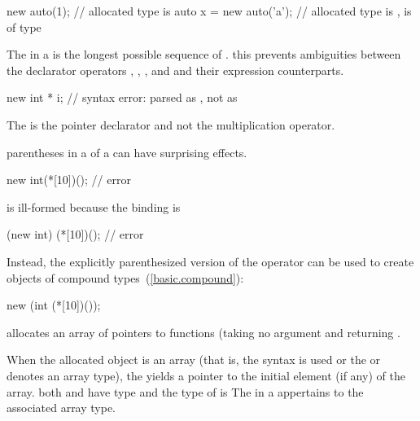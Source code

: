 \enterexample
\begin{codeblock}
new auto(1);                    // allocated type is 
auto x = new auto('a');         // allocated type is ,  is of type 
\end{codeblock}
\exitexample

\pnum
The  in a  is the longest
possible sequence of .
\enternote 
this prevents ambiguities between the declarator operators \tcode{\&}, \tcode{\&\&},
\tcode{*}, and \tcode{[]} and their expression counterparts.
\exitnote 
\enterexample 

\begin{codeblock}
new int * i;                    // syntax error: parsed as , not as 
\end{codeblock}
The \tcode{*} is the pointer declarator and not the multiplication
operator.
\exitexample 

\pnum
\enternote 
{}%
parentheses in a  of a 
can have surprising effects.
\enterexample 

\begin{codeblock}
new int(*[10])();               // error
\end{codeblock}

is ill-formed because the binding is

\begin{codeblock}
(new int) (*[10])();            // error
\end{codeblock}

Instead, the explicitly parenthesized version of the 
operator can be used to create objects of compound
types~(\ref{basic.compound}):

\begin{codeblock}
new (int (*[10])());
\end{codeblock}

allocates an array of  pointers to functions (taking no
argument and returning .
\exitexample 
\exitnote 

\pnum
{}%
When the allocated object is an array (that is, the
 syntax is used or the
 or  denotes an array type), the
 yields a pointer to the initial element (if
any) of the array.
\enternote 
both  and  have type  and
the type of  is 
\exitnote 
The  in a  appertains
to the associated array type.

